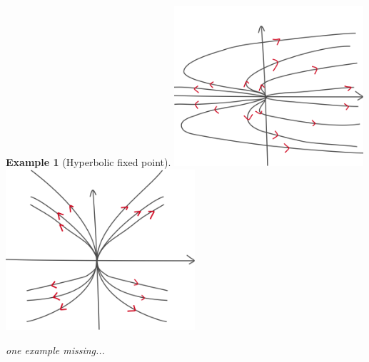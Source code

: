 \documentclass[hidelinks,a4paper, 11pt]{article}
\theoremstyle{plain}
\theoremstyle{break}
\theoremstyle{plain}
\theoremstyle{definition}
\newtheorem*{example}{Example}
\begin{document}
\begin{example}[Hyperbolic fixed point]
	\includegraphics*[width=7.0cm]{topo_conjugate_nonlinear.png}
	\includegraphics*[width=7.0cm]{topo_conjugate.png}
	
\end{example}


\textit{one example missing...}
\end{document}

